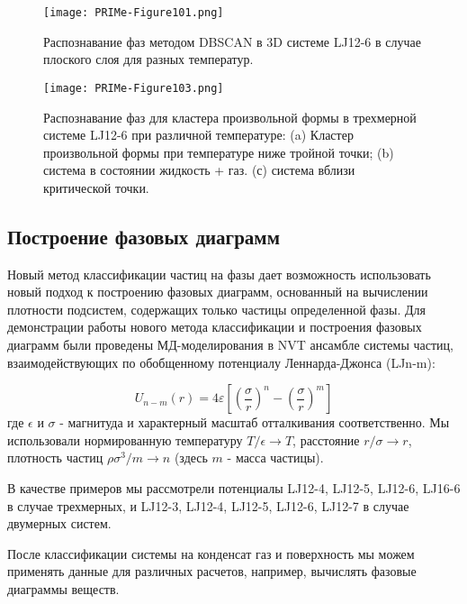\begin{figure}[!t]
    \centering
    \texttt{[image: PRIMe-Figure101.png]}
    \caption{Распознавание фаз методом DBSCAN в 3D системе LJ12-6 в случае плоского слоя для разных температур.}
    \label{D3_flat_layer}
\end{figure}


\begin{figure*}[!t]
    \centering
    \texttt{[image: PRIMe-Figure103.png]}
    \caption{Распознавание фаз для кластера произвольной формы в трехмерной системе LJ12-6 при различной температуре: (a) Кластер произвольной формы при температуре ниже тройной точки; (b) система в состоянии жидкость + газ. (с) система вблизи критической точки.}
    \label{D3_free_conf}
\end{figure*}



\subsection{Построение фазовых диаграмм}
\label{PRIMe-SubSecPhaseDiagram}

Новый метод классификации частиц на фазы дает возможность использовать новый подход к построению фазовых диаграмм, основанный на вычислении плотности подсистем, содержащих только частицы определенной фазы.
Для демонстрации работы нового метода классификации и построения фазовых диаграмм были проведены МД-моделирования в NVT ансамбле системы частиц, взаимодействующих по обобщенному потенциалу Леннарда-Джонса (LJn-m):

\begin{equation}
U_{n-m}(r)=4 \varepsilon\left[\left(\frac{\sigma}{r}\right)^{n}-\left(\frac{\sigma}{r}\right)^{m}\right]
\label{MACR-eq1}
\end{equation}
где $\epsilon$ и $\sigma$ - магнитуда и характерный масштаб отталкивания соответственно.
Мы использовали нормированную температуру $ T/ \epsilon \rightarrow T $, расстояние $ r/ \sigma \rightarrow r $,
плотность частиц $ \rho \sigma ^ 3 / m \rightarrow n$ (здесь $ m $ - масса частицы).

В качестве примеров мы рассмотрели потенциалы LJ12-4, LJ12-5, LJ12-6, LJ16-6 в случае трехмерных, и LJ12-3, LJ12-4, LJ12-5, LJ12-6, LJ12-7 в случае двумерных систем.

После классификации системы на конденсат газ и поверхность мы можем применять данные для различных расчетов, например, вычислять фазовые диаграммы веществ.

